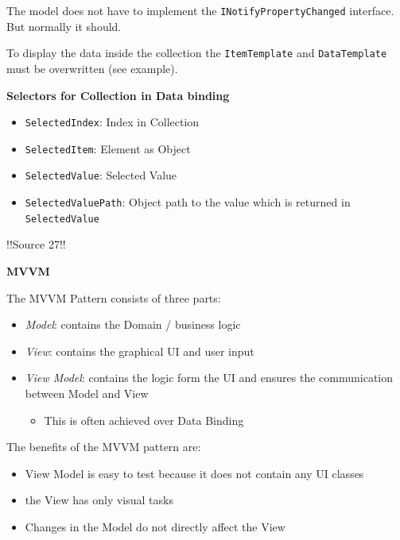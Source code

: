 \documentclass[10pt,twoside,landscape]{article}
\begin{document}
\begin{multicols}{4}
The model does not have to implement the \texttt{INotifyPropertyChanged} interface.
But normally it should.

To display the data inside the collection the \texttt{ItemTemplate} and \texttt{DataTemplate} must be overwritten (see example).

\textbf{Selectors for Collection in Data binding}
\begin{itemize}
\item \texttt{SelectedIndex}: Index in Collection
\item \texttt{SelectedItem}: Element as Object
\item \texttt{SelectedValue}: Selected Value
\item \texttt{SelectedValuePath}: Object path to the value which is returned in \texttt{SelectedValue}
\end{itemize}

!!Source 27!!

\textbf{MVVM}

The MVVM Pattern consists of three parts:
\begin{itemize}
\item \emph{Model}: contains the Domain / business logic
\item \emph{View}: contains the graphical UI and user input
\item \emph{View Model}: contains the logic form the UI and ensures the communication between Model and View
\begin{itemize}
\item This is often achieved over Data Binding
\end{itemize}
\end{itemize}


The benefits of the MVVM pattern are:
\begin{itemize}
\item View Model is easy to test because it does not contain any UI classes
\item the View has only visual tasks
\item Changes in the Model do not directly affect the View
\end{itemize}


\end{multicols}
\end{document}
